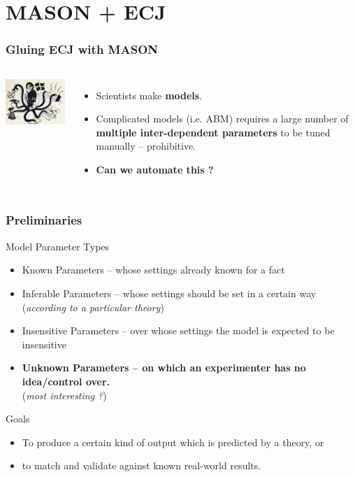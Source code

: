 \documentclass{beamer}
\begin{document}
\section{MASON + ECJ}	%
\begin{frame}
	\frametitle{Gluing ECJ with MASON}
	\begin{columns}[c]
	\column{2in}
		\centering
		\includegraphics[width=2in,keepaspectratio]{octopus.pdf}
	\column{2.5in}
			\begin{itemize}
			\setlength{\itemsep}{15pt}
				\item Scientists make \textbf{models}.
				\item Complicated models (i.e. ABM) requires a large number of \textbf{multiple inter-dependent parameters} to be tuned manually -- prohibitive.
				\item \textbf{Can we automate this ?}
			\end{itemize}
	\end{columns}
\end{frame}
\begin{frame}
	\frametitle{Preliminaries}
	\begin{block}{Model Parameter Types}
		\begin{scriptsize}
			\begin{itemize}
				\item Known Parameters -- whose settings already known for a fact
				\item Inferable Parameters -- whose settings should be set in a certain way \\(\emph{according to a particular theory})
				\item Insensitive Parameters -- over whose settings the model is expected to be insensitive
				\item \textbf{Unknown Parameters -- on which an experimenter has no idea/control over.}\\ (\emph{most interesting ?})
			\end{itemize}
		\end{scriptsize}
	\end{block}
	\vspace{-10pt}
	\begin{block}{Goals}
		\begin{footnotesize}
			\begin{itemize}
				\item To produce a certain kind of output which is predicted by a theory, or 
				\item to match and validate against known real-world results.
			\end{itemize}
		\end{footnotesize}
	\end{block}
\end{frame}
\end{document}
